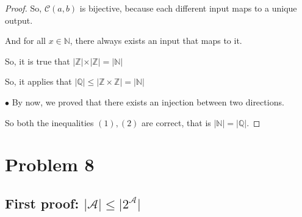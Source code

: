 \documentclass[12pt]{article}
\begin{document}
\begin{proof}
    
    \vspace*{1cm}
    \hspace*{1cm}
    So, $\mathcal{C}(a,b)$ is bijective, because each different input
    maps to a unique output.

    \vspace*{0.3cm}
    \hspace*{1cm}
    And for all $x\in \mathbb{N}$, there always exists an input that maps to it.

    \vspace*{0.3cm}
    \hspace*{1cm}
    So, it is true that $\vert \mathbb{Z}\vert \times \vert \mathbb{Z} \vert = \vert \mathbb{N} \vert$



    \vspace*{1cm}
    \hspace*{1cm}
    So, it applies that $\vert \mathbb{Q}\vert \leq \vert \mathbb{Z} \times \mathbb{Z} \vert
    = \vert \mathbb{N} \vert $
    
    \vspace*{1cm}
    \hspace*{1cm}
    $\bullet$ By now, we proved that there exists an injection between two directions. 

    \vspace*{0.3cm}
    \hspace*{1cm}
    So both the inequalities $(1), (2)$ are correct, that is $\vert \mathbb{N} \vert =
    \vert \mathbb{Q} \vert $.

\end{proof}

\newpage
\section*{Problem 8}

\subsection*{First proof: $\vert \mathcal{A} \vert \leq \vert 2^{\mathcal{A}} \vert$}
\end{document}
